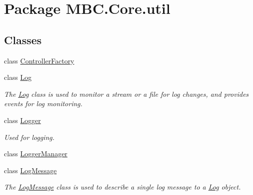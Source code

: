 \hypertarget{namespace_m_b_c_1_1_core_1_1util}{\section{Package M\-B\-C.\-Core.\-util}
\label{namespace_m_b_c_1_1_core_1_1util}
}
\subsection*{Classes}
\begin{DoxyCompactItemize}
\item 
class \hyperlink{class_m_b_c_1_1_core_1_1util_1_1_controller_factory}{Controller\-Factory}
\item 
class \hyperlink{class_m_b_c_1_1_core_1_1util_1_1_log}{Log}
\begin{DoxyCompactList}\small\item\em The \hyperlink{class_m_b_c_1_1_core_1_1util_1_1_log}{Log} class is used to monitor a stream or a file for log changes, and provides events for log monitoring.\end{DoxyCompactList}\item 
class \hyperlink{class_m_b_c_1_1_core_1_1util_1_1_logger}{Logger}
\begin{DoxyCompactList}\small\item\em Used for logging.\end{DoxyCompactList}\item 
class \hyperlink{class_m_b_c_1_1_core_1_1util_1_1_logger_manager}{Logger\-Manager}
\item 
class \hyperlink{class_m_b_c_1_1_core_1_1util_1_1_log_message}{Log\-Message}
\begin{DoxyCompactList}\small\item\em The \hyperlink{class_m_b_c_1_1_core_1_1util_1_1_log_message}{Log\-Message} class is used to describe a single log message to a \hyperlink{class_m_b_c_1_1_core_1_1util_1_1_log}{Log} object.\end{DoxyCompactList}\end{DoxyCompactItemize}
